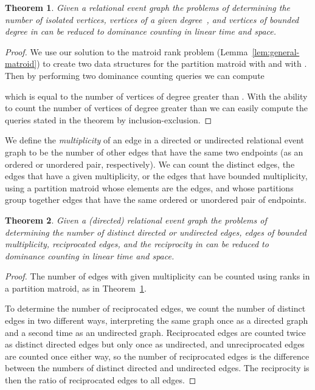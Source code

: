 \documentclass[11pt]{article}
\newtheorem{theorem}{Theorem}
\begin{document}
\begin{theorem}\label{thm:vertex-degree}
Given a relational event graph  the problems of determining the number of isolated vertices, vertices of a given degree~, and vertices of bounded degree in  can be reduced to dominance counting in linear time and space.
\end{theorem}

\begin{proof}
We use our solution to the matroid rank problem (Lemma~\ref{lem:general-matroid}) to create two data structures for the partition matroid with  and with . Then by performing two dominance counting queries we can compute

which is equal to the number of vertices of degree greater than . With the ability to count the number of vertices of degree greater than  we can easily compute the queries stated in the theorem by inclusion-exclusion.
\end{proof}

We define the \emph{multiplicity} of an edge in a directed or undirected relational event graph to be the number of other edges that have the same two endpoints (as an ordered or unordered pair, respectively).
We can count the distinct edges, the edges that have a given multiplicity, or the edges that have bounded multiplicity, using a partition matroid whose elements are the edges, and whose partitions group together edges that have the same ordered or unordered pair of endpoints.

\begin{theorem}
Given a (directed) relational event graph  the problems of determining the number of distinct directed or undirected edges, edges of bounded multiplicity, reciprocated edges, and the reciprocity in   can be reduced to dominance counting in linear time and space.
\end{theorem}

\begin{proof}
The number of edges with given multiplicity can be counted using ranks in a partition matroid, as in Theorem~\ref{thm:vertex-degree}.

To determine the number of reciprocated edges, we count the number of distinct edges in two different ways, interpreting the same graph once as a directed graph and a second time as an undirected graph. Reciprocated edges are counted twice as distinct directed edges but only once as undirected, and unreciprocated edges are counted once either way, so the number of reciprocated edges is the difference between the numbers of distinct directed and undirected edges. The reciprocity is then the ratio of reciprocated edges to all edges.
\end{proof}
\end{document}
